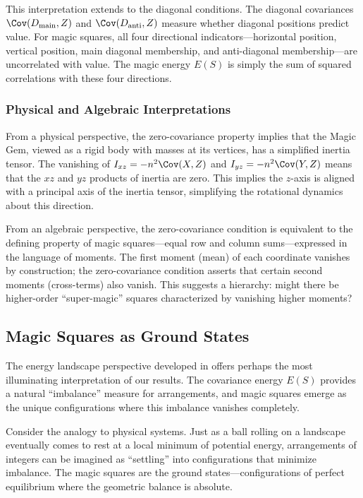This interpretation extends to the diagonal conditions. 
The diagonal covariances $\Cov(D_{\mathrm{main}}, Z)$ and $\Cov(D_{\mathrm{anti}}, Z)$ 
measure whether diagonal positions predict value.
For magic squares, all four directional indicators---horizontal position, vertical position, 
main diagonal membership, and anti-diagonal membership---are uncorrelated with value.
The magic energy $E(S)$ is simply the sum of squared correlations with these four directions.

\subsubsection{Physical and Algebraic Interpretations}

From a physical perspective, the zero-covariance property implies that the Magic Gem, 
viewed as a rigid body with masses at its vertices, has a simplified inertia tensor.
The vanishing of $I_{xz} = -n^2 \Cov(X,Z)$ and $I_{yz} = -n^2 \Cov(Y,Z)$ means that 
the $xz$ and $yz$ products of inertia are zero.
This implies the $z$-axis is aligned with a principal axis of the inertia tensor,
simplifying the rotational dynamics about this direction.

From an algebraic perspective, the zero-covariance condition is equivalent to the defining property 
of magic squares---equal row and column sums---expressed in the language of moments.
The first moment (mean) of each coordinate vanishes by construction;
the zero-covariance condition asserts that certain second moments (cross-terms) also vanish.
This suggests a hierarchy: might there be higher-order ``super-magic'' squares 
characterized by vanishing higher moments?

\subsection{Magic Squares as Ground States}

The energy landscape perspective developed in  offers perhaps 
the most illuminating interpretation of our results.
The covariance energy $E(S)$ provides a natural ``imbalance'' measure for arrangements,
and magic squares emerge as the unique configurations where this imbalance vanishes completely.

Consider the analogy to physical systems.
Just as a ball rolling on a landscape eventually comes to rest at a local minimum of potential energy,
arrangements of integers can be imagined as ``settling'' into configurations that minimize imbalance.
The magic squares are the ground states---configurations of perfect equilibrium 
where the geometric balance is absolute.

